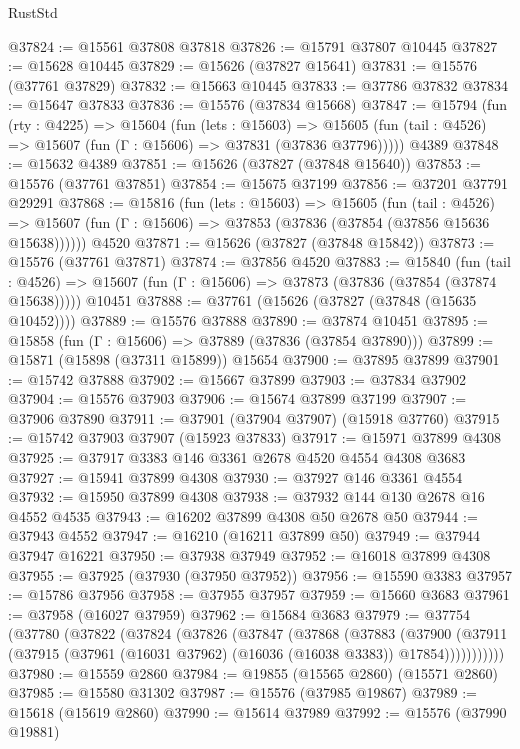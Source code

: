 \begin{lexlean}{RustStd}
\begin{coremodule}
@37824 := @15561 @37808 @37818
@37826 := @15791 @37807 @10445
@37827 := @15628 @10445
@37829 := @15626 (@37827 @15641)
@37831 := @15576 (@37761 @37829)
@37832 := @15663 @10445
@37833 := @37786 @37832
@37834 := @15647 @37833
@37836 := @15576 (@37834 @15668)
@37847 := @15794
    (fun (rty : @4225) =>
    @15604
      (fun (lets : @15603) =>
      @15605 (fun (tail : @4526) => @15607 (fun (Γ : @15606) => @37831 (@37836 @37796)))))
    @4389
@37848 := @15632 @4389
@37851 := @15626 (@37827 (@37848 @15640))
@37853 := @15576 (@37761 @37851)
@37854 := @15675 @37199
@37856 := @37201 @37791 @29291
@37868 := @15816
    (fun (lets : @15603) =>
    @15605
      (fun (tail : @4526) =>
      @15607 (fun (Γ : @15606) => @37853 (@37836 (@37854 (@37856 @15636 @15638))))))
    @4520
@37871 := @15626 (@37827 (@37848 @15842))
@37873 := @15576 (@37761 @37871)
@37874 := @37856 @4520
@37883 := @15840
    (fun (tail : @4526) => @15607 (fun (Γ : @15606) => @37873 (@37836 (@37854 (@37874 @15638)))))
    @10451
@37888 := @37761 (@15626 (@37827 (@37848 (@15635 @10452))))
@37889 := @15576 @37888
@37890 := @37874 @10451
@37895 := @15858 (fun (Γ : @15606) => @37889 (@37836 (@37854 @37890)))
@37899 := @15871 (@15898 (@37311 @15899)) @15654
@37900 := @37895 @37899
@37901 := @15742 @37888
@37902 := @15667 @37899
@37903 := @37834 @37902
@37904 := @15576 @37903
@37906 := @15674 @37899 @37199
@37907 := @37906 @37890
@37911 := @37901 (@37904 @37907) (@15918 @37760)
@37915 := @15742 @37903 @37907 (@15923 @37833)
@37917 := @15971 @37899 @4308
@37925 := @37917 @3383 @146 @3361 @2678 @4520 @4554 @4308 @3683
@37927 := @15941 @37899 @4308
@37930 := @37927 @146 @3361 @4554
@37932 := @15950 @37899 @4308
@37938 := @37932 @144 @130 @2678 @16 @4552 @4535
@37943 := @16202 @37899 @4308 @50 @2678 @50
@37944 := @37943 @4552
@37947 := @16210 (@16211 @37899 @50)
@37949 := @37944 @37947 @16221
@37950 := @37938 @37949
@37952 := @16018 @37899 @4308
@37955 := @37925 (@37930 (@37950 @37952))
@37956 := @15590 @3383
@37957 := @15786 @37956
@37958 := @37955 @37957
@37959 := @15660 @3683
@37961 := @37958 (@16027 @37959)
@37962 := @15684 @3683
@37979 := @37754
    (@37780
      (@37822
        (@37824
          (@37826
            (@37847
              (@37868
                (@37883
                  (@37900
                    (@37911
                      (@37915 (@37961 (@16031 @37962) (@16036 (@16038 @3383)) @17854)))))))))))
@37980 := @15559 @2860
@37984 := @19855 (@15565 @2860) (@15571 @2860)
@37985 := @15580 @31302
@37987 := @15576 (@37985 @19867)
@37989 := @15618 (@15619 @2860)
@37990 := @15614 @37989
@37992 := @15576 (@37990 @19881)

\end{coremodule}
\end{lexlean}
